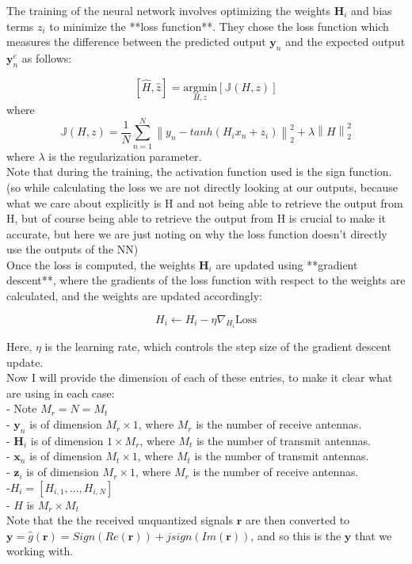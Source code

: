 \documentclass{article}
\begin{document}
The training of the neural network involves optimizing the weights \( \mathbf{H}_i \) and bias terms \( z_i \) to minimize the **loss function**. They chose the loss function which measures the difference between the predicted output \( \mathbf{y}_n \) and the expected output \( \mathbf{y}_n^e \) as follows: 

\[
[\hat{H},\hat{z}] = \underset{H,z}{\text{argmin}} [\mathbb{J}(H,z)]
\] where 
\[
\mathbb{J}(H,z) = \frac{1}{N} \sum_{n=1}^{N} \left\| y_n - tanh(H_i x_n + z_i) \right\|_2^2 + \lambda \left\| H \right\|_2^2
\]where \( \lambda \) is the regularization parameter.\\ Note that during the training, the activation function used is the sign function.(so while calculating the loss we are not directly looking at our outputs, because what we care about explicitly is H and not being able to retrieve the output from H, but of course being able to retrieve the output from H is crucial to make it accurate, but here we are just noting on why the loss function doesn't directly use the outputs of the NN) \\ 

Once the loss is computed, the weights \( \mathbf{H}_i \) are updated using **gradient descent**, where the gradients of the loss function with respect to the weights are calculated, and the weights are updated accordingly:

\[
H_i \leftarrow H_i - \eta \nabla_{H_i} \text{Loss}
\]

Here, \( \eta \) is the learning rate, which controls the step size of the gradient descent update. \\ 

Now I will provide the dimension of each of these entries, to make it clear what are using in each case: \\
- Note $M_r = N = M_t$ \\
- \( \mathbf{y}_n \) is of dimension \( M_r \times 1 \), where \( M_r \) is the number of receive antennas. \\
- \( \mathbf{H}_i \) is of dimension \( 1 \times M_r \), where \( M_t \) is the number of transmit antennas.\\
- \( \mathbf{x}_n \) is of dimension \( M_t \times 1 \), where \( M_t \) is the number of transmit antennas. \\
- \( \mathbf{z}_i \) is of dimension \( M_r \times 1 \), where \( M_r \) is the number of receive antennas. \\
-\(H_i=[H_{i,1}, ... , H_{i,N}]\)\\ 
- \( H \) is $M_r \times M_t$\\ 
Note that the the received unquantized signals $\boldsymbol{r}$ are then converted to $\boldsymbol{y} = \hat{g}(\boldsymbol{r}) = Sign(Re(\boldsymbol{r}))+jsign(Im(\boldsymbol{r}))$, and so this is the $\boldsymbol{y}$ that we working with. 
\end{document}
